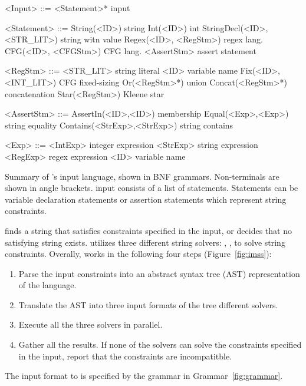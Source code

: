 \begin{Grammar}
    \setlength{\grammarindent}{5em} %
    \begin{grammar}
        <Input> ::= <Statement>*                    \hfill \imss input

        <Statement> ::= String(<ID>)                \hfill string
                \alt Int(<ID>)                      \hfill int
                \alt StringDecl(<ID>, <STR_LIT>)    \hfill string witn value
                \alt Regex(<ID>, <RegStm>)          \hfill regex lang.
                \alt CFG(<ID>, <CFGStm>)            \hfill CFG lang.
                \alt <AssertStm>                    \hfill assert statement

        <RegStm> ::= <STR_LIT>                      \hfill string literal
                \alt <ID>                           \hfill variable name
                \alt Fix(<ID>, <INT_LIT>)           \hfill CFG fixed-sizing
                \alt Or(<RegStm>*)                  \hfill union
                \alt Concat(<RegStm>*)              \hfill concatenation
                \alt Star(<RegStm>)                 \hfill Kleene star

        <AssertStm> ::= AssertIn(<ID>,<ID>)         \hfill membership
                \alt Equal(<Exp>,<Exp>)             \hfill string equality
                \alt Contains(<StrExp>,<StrExp>)    \hfill string contains

        <Exp> ::= <IntExp>                          \hfill integer expression
                \alt <StrExp>                       \hfill string expression
                \alt <RegExp>                       \hfill regex expression
                \alt <ID>                           \hfill variable name

    \end{grammar}
 \caption{\label{fig:grammar}Summary of \imss's input language, shown in BNF grammars.
 Non-terminals are shown in angle brackets. \imss input consists of a list of statements.
 Statements can be variable declaration statements or assertion statements which represent
 string constraints.}
 \end{Grammar}

\imss finds a string that satisfies constraints specified in the input,
or decides that no satisfying string exists. \imss utilizes three different
string solvers: \hampi, \dprle, \zstr to solve string
constraints. Overally, \imss works in the following four steps (Figure~\ref{fig:imss}):
\begin{enumerate}
    \item Parse the input constraints into an abstract syntax tree (AST)
    representation of the \imss language.
    \item Translate the AST into three input formats of the tree different solvers.
    \item Execute all the three solvers in parallel.
    \item Gather all the results. If none of the solvers can solve the constraints
    specified in the input, report that the constraints are incompatitble.
\end{enumerate}
The input format to \imss is specified by the grammar in Grammar~\ref{fig:grammar}.

